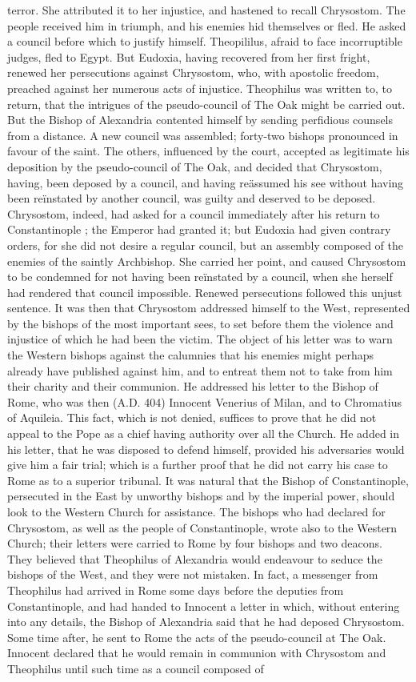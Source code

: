 terror. She attributed it to her injustice, and hastened to recall Chrysostom. The people received him in triumph, and his enemies hid themselves or fled. He asked a council before which to justify himself. Theopililus, afraid to face incorruptible judges, fled to Egypt. But Eudoxia, having recovered from her first fright, renewed her persecutions against Chrysostom, who, with apostolic freedom, preached against her numerous acts of injustice. Theophilus was written to, to return, that the intrigues of the pseudo-council of The Oak might be carried out. But the Bishop of Alexandria contented himself by sending perfidious counsels from a distance. A new council was assembled; forty-two bishops pronounced in favour of the saint. The others, influenced by the court, accepted as legitimate his deposition by the pseudo-council of The Oak, and decided that Chrysostom, having, been deposed by a council, and having reässumed his see without having been reïnstated by another council, was guilty and deserved to be deposed. Chrysostom, indeed, had asked for a council immediately after his return to Constantinople ; the Emperor had granted it; but Eudoxia had given contrary orders, for she did not desire a regular council, but an assembly composed of the enemies of the saintly Archbishop. She carried her point, and caused Chrysostom to be condemned for not having been reïnstated by a council, when she herself had rendered that council impossible. Renewed persecutions followed this unjust sentence. It was then that Chrysostom addressed himself to the West, represented by the bishops of the most important sees, to set before them the violence and injustice of which he had been the victim. The object of his letter was to warn the Western bishops against the calumnies that his enemies might perhaps already have published against him, and to entreat them not to take from him their charity and their communion. He addressed his letter to the Bishop of Rome, who was then (A.D. 404) Innocent Venerius of Milan, and to Chromatius of Aquileia. This fact, which is not denied, suffices to prove that he did not appeal to the Pope as a chief having authority over all the Church. He added in his letter, that he was disposed to defend himself, provided his adversaries would give him a fair trial; which is a further proof that he did not carry his case to Rome as to a superior tribunal. It was natural that the Bishop of Constantinople, persecuted in the East by unworthy bishops and by the imperial power, should look to the Western Church for assistance. The bishops who had declared for Chrysostom, as well as the people of Constantinople, wrote also to the Western Church; their letters were carried to Rome by four bishops and two deacons. They believed that Theophilus of Alexandria would endeavour to seduce the bishops of the West, and they were not mistaken. In fact, a messenger from Theophilus had arrived in Rome some days before the deputies from Constantinople, and had handed to Innocent a letter in which, without entering into any details, the Bishop of Alexandria said that he had deposed Chrysostom. Some time after, he sent to Rome the acts of the pseudo-council at The Oak. Innocent declared that he would remain in communion with Chrysostom and Theophilus until such time as a council composed of 